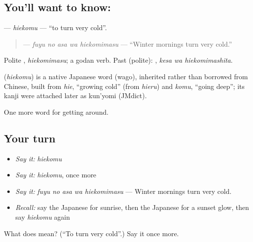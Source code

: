 \subsection*{You'll want to know: }
\textbf{} — \emph{hiekomu} — \textquotedblleft{}to turn very cold\textquotedblright{}.

\begin{quote}
\textbf{  } — \emph{fuyu no asa wa hiekomimasu} — \textquotedblleft{}Winter mornings turn very cold.\textquotedblright{}
\end{quote}

Polite \textbf{}, \emph{hiekomimasu}; a godan verb. Past (polite): \textbf{ }, \emph{kesa wa hiekomimashita}.

\begin{cousinweb}
\textbf{} (\emph{hiekomu}) is a native Japanese word (wago), inherited rather than borrowed from Chinese, built from \emph{hie}, \textquotedblleft{}growing cold\textquotedblright{} (from \emph{hieru}) and \emph{komu}, \textquotedblleft{}going deep\textquotedblright{}; its kanji were attached later as kun'yomi (JMdict).
\end{cousinweb}

\begin{grammarlens}[title={What you've built}]
One more word for getting around.
\end{grammarlens}

\subsection*{Your turn}
\begin{itemize}
\raggedright
  \item \emph{Say it:} \emph{hiekomu}
  \item \emph{Say it:} \emph{hiekomu}, once more
  \item \emph{Say it:} \emph{fuyu no asa wa hiekomimasu} — Winter mornings turn very cold.
  \item \emph{Recall:} say the Japanese for sunrise, then the Japanese for a sunset glow, then say \emph{hiekomu} again
\end{itemize}

\begin{tcolorbox}[breakable,colback=teal!4,colframe=teal!35!black,title={Before you move on}]
What does  mean? (\textquotedblleft{}To turn very cold\textquotedblright{}.) Say it once more.
\end{tcolorbox}
